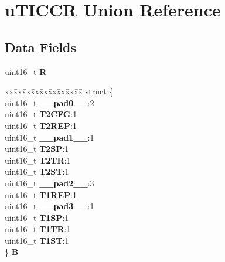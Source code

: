 \hypertarget{unionuTICCR}{}\section{u\+T\+I\+C\+CR Union Reference}
\label{unionuTICCR}
\subsection*{Data Fields}
\begin{DoxyCompactItemize}
\item 
\mbox{\label{unionuTICCR_ae6a2577155af57d4a55a7bcd9798897f}} 
uint16\+\_\+t {\bfseries R}
\item 
\mbox{\label{unionuTICCR_a2f72c2102cc8e9c4e9f33d67706f3727}} 
\begin{tabbing}
xx\=xx\=xx\=xx\=xx\=xx\=xx\=xx\=xx\=\kill
struct \{\\
\>uint16\_t {\bfseries \_\_pad0\_\_}:2\\
\>uint16\_t {\bfseries T2CFG}:1\\
\>uint16\_t {\bfseries T2REP}:1\\
\>uint16\_t {\bfseries \_\_pad1\_\_}:1\\
\>uint16\_t {\bfseries T2SP}:1\\
\>uint16\_t {\bfseries T2TR}:1\\
\>uint16\_t {\bfseries T2ST}:1\\
\>uint16\_t {\bfseries \_\_pad2\_\_}:3\\
\>uint16\_t {\bfseries T1REP}:1\\
\>uint16\_t {\bfseries \_\_pad3\_\_}:1\\
\>uint16\_t {\bfseries T1SP}:1\\
\>uint16\_t {\bfseries T1TR}:1\\
\>uint16\_t {\bfseries T1ST}:1\\
\} {\bfseries B}\\


\end{tabbing}
\end{DoxyCompactItemize}
